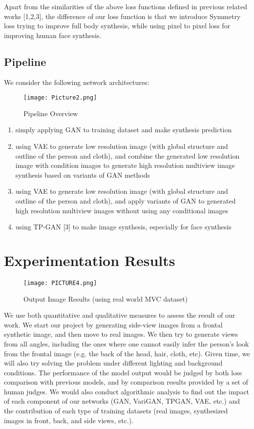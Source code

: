 \documentclass[10pt,conference]{IEEEtran}
\begin{document}
Apart from the similarities of the above loss functions defined in previous related works [1,2,3], the difference of our loss function is that we introduce Symmetry loss trying to improve full body synthesis, while using pixel to pixel loss for improving human face synthesis.

\subsection{Pipeline}
We consider the following network architectures:

\begin{figure*}[htbp]
\centering
\texttt{[image: Picture2.png]}
\caption{Pipeline Overview}
\end{figure*}

\renewcommand{\labelenumi}{\roman{enumi}}
 \begin{enumerate}
   \item simply applying GAN to training dataset and make synthesis prediction
   \item using VAE to generate low resolution image (with global structure and outline of the person and cloth), and combine the generated low resolution image with condition images to generate high resolution multiview image synthesis based on variants of GAN methods
   \item using VAE to generate low resolution image (with global structure and outline of the person and cloth), and apply variants of GAN to generated high resolution multiview images without using any conditional images
   \item using TP-GAN [3] to make image synthesis, especially for face synthesis
 \end{enumerate}

\section{Experimentation Results}

\begin{figure}[htbp]
\centering
\texttt{[image: PICTURE4.png]}
\caption{Output Image Results (using real world MVC dataset)}
\end{figure}

We use both quantitative and qualitative measures to assess the result of our work. 
We  start our project by generating side-view images from a frontal synthetic image, and then move to real images. We then try to generate views from all angles, including the ones where one cannot easily infer the person’s look from the frontal image (e.g. the back of the head, hair, cloth, etc). Given time, we will also try solving the problem under different lighting and background conditions. The performance of the model output would be judged by both loss comparison with previous models, and by comparison results provided by a set of human judges. We would also conduct algorithmic analysis to find out the impact of each component of our networks (GAN, VariGAN, TPGAN, VAE, etc.) and the contribution of each type of training datasets (real images, synthesized images in front, back, and side views, etc.).
\end{document}
